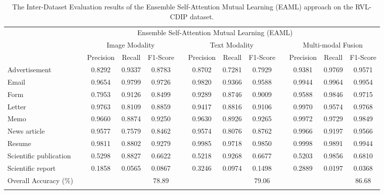 \documentclass[twocolumn]{svjour3}
\begin{document}
\setlength\tabcolsep{3.8 pt}
\begin{table*}[tbh]
\small
\centering
\caption{The Inter-Dataset Evaluation results of the Ensemble Self-Attention Mutual Learning (EAML) approach on the RVL-CDIP dataset.}
\resizebox{\textwidth}{!} {\begin{tabular}{lcccccccccccc}
    \hline\noalign{\smallskip}
     \multicolumn{1}{c}{} && \multicolumn{10}{c}{Ensemble Self-Attention Mutual Learning (EAML)} \\
         \noalign{\smallskip}\hline\noalign{\smallskip}
         \multicolumn{1}{c}{Class Labels} && \multicolumn{3}{c}{Image Modality} && \multicolumn{3}{c}{Text Modality} && \multicolumn{3}{c}{Multi-modal Fusion}\\
         \noalign{\smallskip}\hline\noalign{\smallskip}
          && Precision & Recall & F1-Score &&  Precision & Recall & F1-Score && Precision & Recall & F1-Score\\
         \cmidrule{3-13}
         Advertisement 
         && 0.8292 & 0.9337 & 0.8783
         && 0.8702 & 0.7281 & 0.7929 
         && 0.9381 & 0.9769 & 0.9571 
         \\
         Email 
         && 0.9654 & 0.9799 & 0.9726
         && 0.9820 & 0.9366 & 0.9588 
         && 0.9944 & 0.9964 & 0.9954 
         \\
         Form 
         && 0.7953 & 0.9126 & 0.8499 
         && 0.9289 & 0.8746 & 0.9009 
         && 0.9588 & 0.9846 & 0.9715 
         \\
         Letter 
         && 0.9763 & 0.8109 & 0.8859
         && 0.9417 & 0.8816 & 0.9106 
         && 0.9970 & 0.9574 & 0.9768
         \\
         Memo 
         && 0.9660 & 0.8874 & 0.9250 
         && 0.9630 & 0.8926 & 0.9265 
         && 0.9972 & 0.9729 & 0.9849 
         \\
         News article 
         && 0.9577 & 0.7579 & 0.8462
         && 0.9574 & 0.8076 & 0.8762 
         && 0.9966 & 0.9197 & 0.9566 
         \\
         Resume 
         && 0.9811 & 0.8802 & 0.9279
         && 0.9985 & 0.9718 & 0.9850 
         && 0.9998 & 0.9891 & 0.9944 
         \\
         Scientific publication 
         && 0.5298 & 0.8827 & 0.6622
         && 0.5218 & 0.9268 & 0.6677 
         && 0.5203 & 0.9856 & 0.6810
         \\
         Scientific report 
         && 0.1858 & 0.0565 & 0.0867
         && 0.3246 & 0.0974 & 0.1498 
         && 0.2889 & 0.0197 & 0.0368 
         \\
    \noalign{\smallskip}\hline\noalign{\smallskip}
        Overall Accuracy (\%) && & & 78.89 &&  &  & 79.06 &&  &  & 86.68 \\
    \noalign{\smallskip}\hline
    
    \end{tabular}}
    \label{tab:Evaluation of APML on RVLCDIP}
    
\end{table*}
\end{document}
